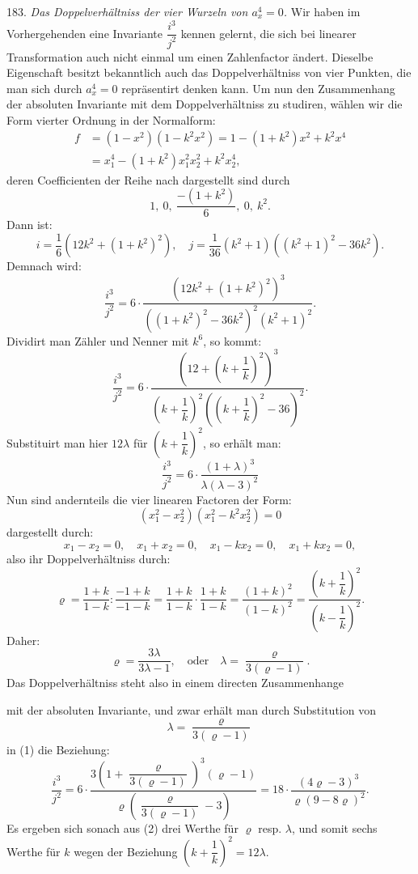 \documentclass[11pt]{article}
\providecommand{\gesperrt}[1]{\textls[130]{#1}}
\providecommand{\weberpage}[1]{}
\providecommand{\weq}[2]{\begin{equation}\tag{#1}#2\end{equation}}
\begin{document}
\weberpage{203}
183. \textit{Das Doppelverh\"altniss der vier Wurzeln von $a_x^4=0$.} Wir haben im Vorhergehenden eine Invariante $\dfrac{i^3}{j^2}$ kennen gelernt, die sich bei linearer Transformation auch nicht einmal um einen Zahlenfactor \"andert. Dieselbe Eigenschaft besitzt bekanntlich auch das Doppelverh\"altniss von vier Punkten, die man sich durch $a_x^4=0$ repr\"asentirt denken kann. Um nun den Zusammenhang der absoluten Invariante mit dem Doppelverh\"altniss zu studiren, w\"ahlen wir die Form vierter Ordnung in der \gesperrt{Legendre'schen} Normalform:
\[
\begin{aligned}
f &= (1-x^2)(1-k^2x^2) = 1-(1+k^2)x^2+k^2x^4\\
  &= x_1^4-(1+k^2)x_1^2x_2^2+k^2x_2^4,
\end{aligned}
\]
deren Coefficienten der Reihe nach dargestellt sind durch
\[
1,\ 0,\ \frac{-(1+k^2)}{6},\ 0,\ k^2.
\]
Dann ist:
\[
i = \frac{1}{6}(12k^2+(1+k^2)^2), \quad j = \frac{1}{36}(k^2+1)((k^2+1)^2-36k^2).
\]
Demnach wird:
\[
\frac{i^3}{j^2} = 6\cdot\frac{(12k^2+(1+k^2)^2)^3}{((1+k^2)^2-36k^2)^2(k^2+1)^2}.
\]
Dividirt man Z\"ahler und Nenner mit $k^6$, so kommt:
\[
\frac{i^3}{j^2} = 6\cdot\frac{\left(12+\left(k+\dfrac{1}{k}\right)^2\right)^3}{\left(k+\dfrac{1}{k}\right)^2\left(\left(k+\dfrac{1}{k}\right)^2-36\right)^2}.
\]
Substituirt man hier $12\lambda$ f\"ur $\left(k+\dfrac{1}{k}\right)^2$, so erh\"alt man:
\weq{1}{\frac{i^3}{j^2} = 6\cdot\frac{(1+\lambda)^3}{\lambda(\lambda-3)^2}}
Nun sind andernteils die vier linearen Factoren der Form:
\[
(x_1^2-x_2^2)(x_1^2-k^2x_2^2)=0
\]
dargestellt durch:
\[
x_1-x_2=0,\quad x_1+x_2=0,\quad x_1-kx_2=0,\quad x_1+kx_2=0,
\]
also ihr Doppelverh\"altniss durch:
\[
\varrho = \frac{1+k}{1-k}:\frac{-1+k}{-1-k} = \frac{1+k}{1-k}\cdot\frac{1+k}{1-k} = \frac{(1+k)^2}{(1-k)^2} = \frac{\left(k+\dfrac{1}{k}\right)^2}{\left(k-\dfrac{1}{k}\right)^2}.
\]
Daher:
\[
\varrho = \frac{3\lambda}{3\lambda-1}, \quad \text{oder} \quad \lambda = \frac{\varrho}{3(\varrho-1)}.
\]
Das Doppelverh\"altniss steht also in einem directen Zusammenhange


\weberpage{204}
mit der absoluten Invariante, und zwar erh\"alt man durch Substitution von
\[
\lambda = \frac{\varrho}{3(\varrho-1)}
\]
in (1) die Beziehung:
\weq{2}{\frac{i^3}{j^2} = 6\cdot\frac{3\left(1+\dfrac{\varrho}{3(\varrho-1)}\right)^3(\varrho-1)}{\varrho\left(\dfrac{\varrho}{3(\varrho-1)}-3\right)} = 18\cdot\frac{(4\varrho-3)^3}{\varrho(9-8\varrho)^2}.}
Es ergeben sich sonach aus (2) drei Werthe f\"ur $\varrho$ resp. $\lambda$, und somit sechs Werthe f\"ur $k$ wegen der Beziehung $\left(k+\dfrac{1}{k}\right)^2=12\lambda$.
\end{document}
